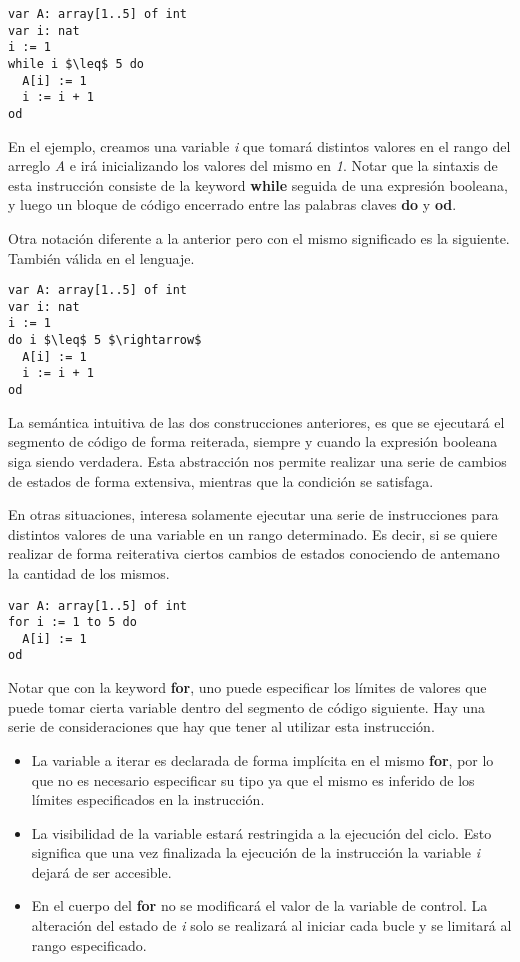 \documentclass{article}
\begin{document}
\begin{lstlisting}
var A: array[1..5] of int
var i: nat
i := 1
while i $\leq$ 5 do
  A[i] := 1
  i := i + 1
od
\end{lstlisting}

En el ejemplo, creamos una variable \textit{i} que tomará distintos valores en el rango del arreglo \textit{A} e irá inicializando los valores del mismo en \textit{1}.
Notar que la sintaxis de esta instrucción consiste de la keyword \textbf{while} seguida de una expresión booleana, y luego un bloque de código encerrado entre las palabras claves \textbf{do} y \textbf{od}.

Otra notación diferente a la anterior pero con el mismo significado es la siguiente.
También válida en el lenguaje.

\begin{lstlisting}
var A: array[1..5] of int
var i: nat
i := 1
do i $\leq$ 5 $\rightarrow$
  A[i] := 1
  i := i + 1
od
\end{lstlisting}

La semántica intuitiva de las dos construcciones anteriores, es que se ejecutará el segmento de código de forma reiterada, siempre y cuando la expresión booleana siga siendo verdadera.
Esta abstracción nos permite realizar una serie de cambios de estados de forma extensiva,  mientras que la condición se satisfaga.

En otras situaciones, interesa solamente ejecutar una serie de instrucciones para distintos valores de una variable en un rango determinado.
Es decir, si se quiere realizar de forma reiterativa ciertos cambios de estados conociendo de antemano la cantidad de los mismos.

\begin{lstlisting}
var A: array[1..5] of int
for i := 1 to 5 do
  A[i] := 1
od
\end{lstlisting}

Notar que con la keyword \textbf{for}, uno puede especificar los límites de valores que puede tomar cierta variable dentro del segmento de código siguiente.
Hay una serie de consideraciones que hay que tener al utilizar esta instrucción.

\begin{itemize}
\item La variable a iterar es declarada de forma implícita en el mismo \textbf{for}, por lo que no es necesario especificar su tipo ya que el mismo es inferido de los límites especificados en la instrucción.
\item La visibilidad de la variable estará restringida a la ejecución del ciclo.
Esto significa que una vez finalizada la ejecución de la instrucción la variable \textit{i} dejará de ser accesible.
\item En el cuerpo del \textbf{for} no se modificará el valor de la variable de control.
La alteración del estado de \textit{i} solo se realizará al iniciar cada bucle y se limitará al rango especificado.
\end{itemize}
\end{document}
